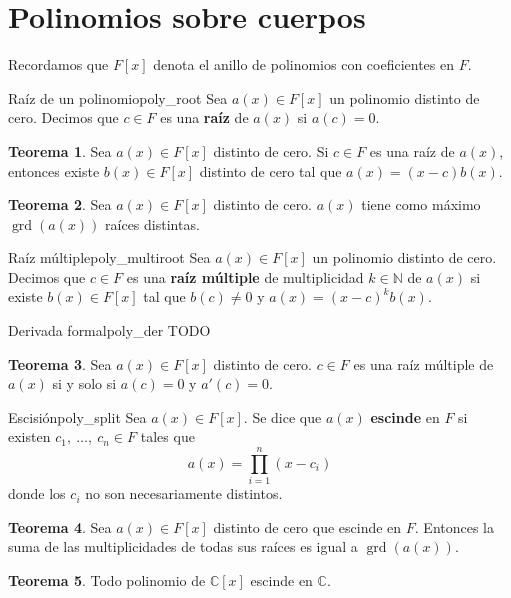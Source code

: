 \documentclass[a4paper]{book}
\theoremstyle{definition}
\newtheorem{theorem}{Teorema}[section]
\theoremstyle{ejemplo}
\theoremstyle{demostracion}
\newcommand{\complejos}{\mathbb{C}}
\newcommand{\naturales}{\mathbb{N}}
\DeclareMathOperator{\grado}{grd}
\begin{document}
\section{Polinomios sobre cuerpos}
Recordamos que $F[x]$ denota el anillo de polinomios con coeficientes en $F$.
\begin{define}{Raíz de un polinomio}{poly_root}
	Sea $a(x) \in F[x]$ un polinomio distinto de cero. Decimos que $c \in F$ es una \textbf{raíz} de $a(x)$ si $a(c) = 0$.
\end{define}
\begin{theorem}
	Sea $a(x) \in F[x]$ distinto de cero. Si $c \in F$ es una raíz de $a(x)$, entonces existe $b(x) \in F[x]$ distinto de cero tal que $a(x) = (x - c)b(x)$.
\end{theorem}
\begin{theorem}
	Sea $a(x) \in F[x]$ distinto de cero. $a(x)$ tiene como máximo $\grado(a(x))$ raíces distintas.
\end{theorem}
\begin{define}{Raíz múltiple}{poly_multiroot}
	Sea $a(x) \in F[x]$ un polinomio distinto de cero. Decimos que $c \in F$ es una \textbf{raíz múltiple} de multiplicidad $k \in \naturales$ de $a(x)$ si existe $b(x) \in F[x]$ tal que $b(c) \neq 0$ y $a(x) = (x-c)^k b(x)$.
\end{define}
\begin{define}{Derivada formal}{poly_der}
	TODO
\end{define}
\begin{theorem}
	Sea $a(x) \in F[x]$ distinto de cero. $c \in F$ es una raíz múltiple de $a(x)$ si y solo si $a(c) = 0$ y $a'(c) = 0$.
\end{theorem}


\begin{define}{Escisión}{poly_split}
	Sea $a(x) \in F[x]$. Se dice que $a(x)$ \textbf{escinde} en $F$ si existen $c_1,\ \ldots,\ c_n \in F$ tales que
	\begin{equation*}
		a(x) = \prod_{i=1}^n (x - c_i)
	\end{equation*}
	donde los $c_i$ no son necesariamente distintos.
\end{define}
\begin{theorem}
	Sea $a(x) \in F[x]$ distinto de cero que escinde en $F$. Entonces la suma de las multiplicidades de todas sus raíces es igual a $\grado(a(x))$.
\end{theorem}
\begin{theorem}
	Todo polinomio de $\complejos[x]$ escinde en $\complejos$.
\end{theorem}
\end{document}
